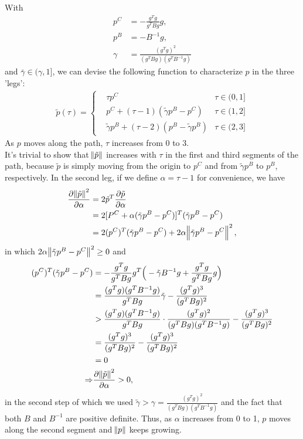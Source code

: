 \documentclass[11pt]{article}
\begin{document}
\maketitle
\section{}
With 
\begin{equation}\begin{split} 
p^C &= -\frac{g^Tg}{g^TBg}g, \\
p^B &= -B^{-1}g, \\
\gamma &= \frac{(g^Tg)^2}{(g^TBg)(g^TB^{-1}g)}
\end{split}\nonumber\end{equation} 
and $\bar\gamma\in(\gamma,1]$, we can devise the following function to characterize $p$ in the three 'legs':
\begin{equation}\begin{split} 
\tilde p(\tau)=\left\{
\begin{array}{rcl}
&\tau p^C & {\tau \in (0,1]}\\
&p^C + (\tau-1)(\tilde\gamma p^B - p^C) & {\tau \in (1,2]}\\
&\tilde \gamma p^B + (\tau - 2) (p^B - \tilde\gamma p^B) & {\tau \in (2,3]}
\end{array} \right.
\end{split}\nonumber\end{equation}
As $p$ moves along the path, $\tau$ increases from $0$ to $3$. \\[0.3cm]
It's trivial to show that $\norm{\tilde p}$ increases with $\tau$ in the first and third segments of the path, because $\tilde p$ is simply moving from the origin to $p^C$ and from $\tilde\gamma p^B$ to $p^B$, respectively. In the second leg, if we define $\alpha = \tau - 1$ for convenience, we have 
\begin{equation}\begin{split} 
\frac{\partial \norm{\tilde p}^2}{\partial \alpha} &= 2\tilde p^T \frac{\partial \tilde p}{\partial\alpha}\\
&= 2[P^C + \alpha (\tilde\gamma p^B-p^C)]^T(\tilde\gamma p^B - p^C) \\
&=2(p^C)^T(\tilde \gamma p^B-p^C) + 2\alpha\norm{\tilde\gamma p^B - p^C}^2,
\end{split}\nonumber\end{equation} 
in which $2\alpha\norm{\tilde\gamma p^B - p^C}^2\geq 0$ and 
\begin{equation}\begin{split} 
(p^C)^T(\tilde\gamma p^B-p^C) & = -\frac{g^Tg}{g^TBg}g^T\Big( -\tilde\gamma B^{-1}g + \frac{g^Tg}{g^TBg}g \Big)\\
&= \frac{(g^Tg)(g^TB^{-1}g)}{g^TBg}\tilde\gamma - \frac{(g^Tg)^3}{(g^TBg)^2}\\
&> \frac{(g^Tg)(g^TB^{-1}g)}{g^TBg}\cdot \frac{(g^Tg)^2}{(g^TBg)(g^TB^{-1}g)} - \frac{(g^Tg)^3}{(g^TBg)^2}\\
&=\frac{(g^Tg)^3}{(g^TBg)^2} - \frac{(g^Tg)^3}{(g^TBg)^2}\\
&=0 \\
\Rightarrow &\frac{\partial\norm{\tilde p}^2}{\partial \alpha} >0,
\end{split}\nonumber\end{equation} 
in the second step of which we used $\tilde \gamma > \gamma = \frac{(g^Tg)^2}{(g^TBg)(g^TB^{-1}g)}$ and the fact that both $B$ and $B^{-1}$ are positive definite. Thus, as $\alpha$ increases from 0 to 1, $p$ moves along the second segment and $\norm{p}$ keeps growing.
\end{document}
